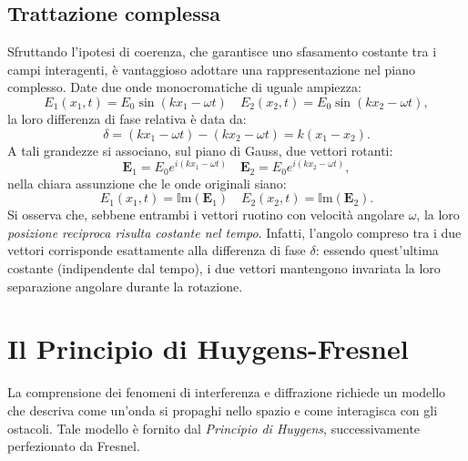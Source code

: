 \documentclass[a4paper,11pt]{report}
\begin{document}
\subsection{Trattazione complessa}
Sfruttando l'ipotesi di coerenza, che garantisce uno sfasamento costante tra i campi interagenti, è vantaggioso adottare una rappresentazione nel piano complesso.
Date due onde monocromatiche di uguale ampiezza:
\begin{equation}
    E_1(x_1,t) = E_0\sin(kx_1 -\omega t) \quad E_2(x_2,t) = E_0\sin(kx_2 -\omega t),
\end{equation}
la loro differenza di fase relativa è data da:
\begin{equation}
    \delta = (kx_1 -\omega t) - (kx_2 -\omega t) = k(x_1-x_2).
\end{equation}
A tali grandezze si associano, sul piano di Gauss, due vettori rotanti:
\begin{equation}
    \bm{E}_1 = E_0 e^{i(kx_1 -\omega t)} \quad \bm{E}_2 = E_0 e^{i(kx_2 -\omega t)},
\end{equation}
nella chiara assunzione che le onde originali siano:
\begin{equation}
    E_1(x_1,t) = \mathbb{I}\text{m}(\bm{E}_1) \quad E_2(x_2,t) = \mathbb{I}\text{m}(\bm{E}_2).
\end{equation}
Si osserva che, sebbene entrambi i vettori ruotino con velocità angolare $\omega$, la loro \textit{posizione reciproca risulta costante nel tempo}.
Infatti, l'angolo compreso tra i due vettori corrisponde esattamente alla differenza di fase $\delta$: essendo quest'ultima costante (indipendente dal tempo), i due vettori mantengono invariata la loro separazione angolare durante la rotazione.

\section{Il Principio di Huygens-Fresnel}

La comprensione dei fenomeni di interferenza e diffrazione richiede un modello che descriva come un'onda si propaghi nello spazio e come interagisca con gli ostacoli. Tale modello è fornito dal \textit{Principio di Huygens}, successivamente perfezionato da Fresnel.
\end{document}
